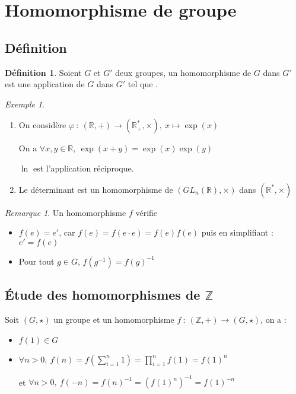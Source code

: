 \documentclass[]{article}
\theoremstyle{remark}
\newtheorem{myrem}{Remarque}
\newtheorem{myexmpl}{Exemple}
\theoremstyle{definition}
\newtheorem{mydef}{Définition}
\newcommand{\funcinline}[5]{
#1 ~ : ~ #2 \longrightarrow #3, ~ #4 \longmapsto #5
}
\newcommand{\funcshort}[3]{
#1 ~ : ~ #2 \longrightarrow #3
}
\begin{document}
\section{Homomorphisme de groupe}

\subsection{Définition}

\begin{mydef}
	Soient $G$ et $G'$ deux groupes, un homomorphisme de $G$ dans $G'$ est une application de $G$ dans $G'$ tel que .
\end{mydef}

\begin{myexmpl}
	\leavevmode
	\begin{enumerate}
		\item On considère $\funcinline{\varphi}{(\mathbb{R}, +)}{(\mathbb{R}^*_+, \times)}{x}{\exp(x)}$
		
		On a $\forall x, y \in \mathbb{R}, ~ \exp(x+y)=\exp(x)\exp(y)$
		
		$\ln$ est l'application réciproque.
		
		\item Le déterminant est un homomorphisme de $(GL_n(\mathbb{R}), \times)$ dans $(\mathbb{R}^*, \times)$
	\end{enumerate}
\end{myexmpl}

\begin{myrem}
	Un homomorphisme $f$ vérifie 
	\begin{itemize}
		\item $f(e)=e'$, car $f(e)=f(e \cdot e)=f(e)f(e)$ puis en simplifiant : $e' = f(e)$
		\item Pour tout $g \in G$, $f(g^{-1})=f(g)^{-1}$
	\end{itemize}
\end{myrem}

\subsection{Étude des homomorphismes de $\mathbb{Z}$}

Soit $(G, \star)$ un groupe et un homomorphisme  $\funcshort{f}{(\mathbb{Z}, +)}{(G, \star)}$, on a :
\begin{itemize}
	\item $f(1) \in G$
	\item $\displaystyle \forall n > 0, ~ f(n) = f\left(\sum_{i=1}^{n} 1\right) = \prod_{i=1}^{n} f(1) = f(1)^n$
	
	et $\displaystyle \forall n > 0, ~ f(-n) = f(n)^{-1} = \left(f(1)^n\right)^{-1} = f(1)^{-n}$
\end{itemize}
\end{document}
